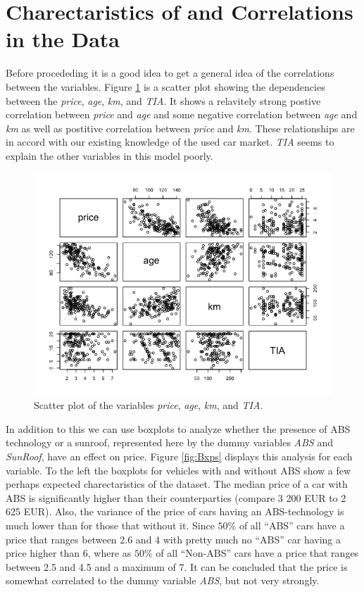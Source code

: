 \section{Charectaristics of and Correlations in the Data} %
\label{sec:Char_Corr}

Before procededing it is a good idea to get a general idea of the correlations between the variables. Figure \ref{fig:Scatter} is a scatter plot showing the dependencies between the \textit{price}, \textit{age}, \textit{km}, and \textit{TIA}. It shows a relavitely strong postive correlation between \textit{price} and \textit{age} and some negative correlation between \textit{age} and \textit{km} as well as postitive correlation between \textit{price} and \textit{km}. These relationships are in accord with our existing knowledge of the used car market. \textit{TIA} seems to explain the other variables in this model poorly.

\begin{figure}[H]
  \begin{center}
    \includegraphics[scale=0.7]{./img/Scatter.png}
    \end{center}
  \caption{Scatter plot of the variables \textit{price}, \textit{age}, \textit{km}, and \textit{TIA}.}
  \label{fig:Scatter}
\end{figure}

\noindent
In addition to this we can use boxplots to analyze whether the presence of ABS technology or a sunroof, represented here by the dummy variables \textit{ABS} and \textit{SunRoof}, have an effect on price. Figure \ref{fig:Bxps} displays this analysis for each variable. To the left the boxplots for vehicles with and without ABS show a few perhaps expected charectaristics of the dataset. The median price of a car with ABS is significantly higher than their counterparties (compare 3 200 EUR to 2 625 EUR). Also, the variance of the price of cars having an ABS-technology is much lower than for those that without it. Since $50\%$ of all ``ABS'' cars have a price that ranges between 2.6 and 4 with pretty much no ``ABS'' car having a price higher than 6, where as $50\%$ of all ``Non-ABS'' cars have a price that ranges between 2.5 and 4.5 and a maximum of 7. It can be concluded that the price is somewhat correlated to the dummy variable \textit{ABS}, but not very strongly.


